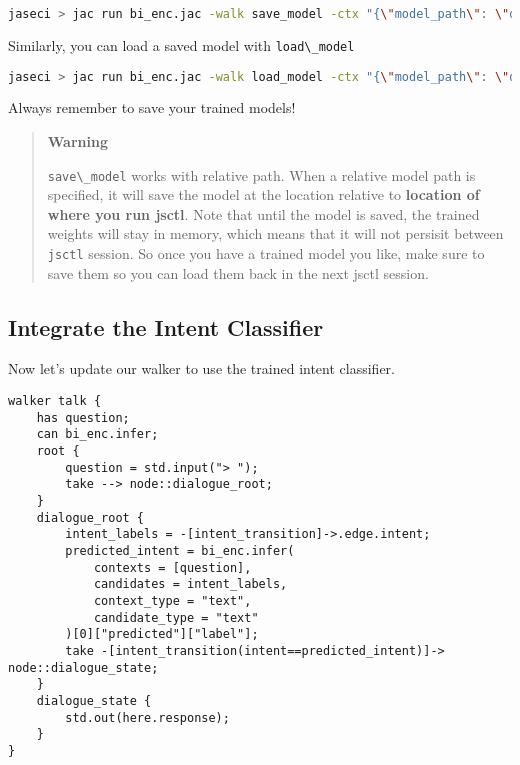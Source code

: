 \begin{lstlisting}[language=bash]
jaseci > jac run bi_enc.jac -walk save_model -ctx "{\"model_path\": \"dialogue_intent_model\"}"
\end{lstlisting}

Similarly, you can load a saved model with
\passthrough{\lstinline!load\_model!}

\begin{lstlisting}[language=bash]
jaseci > jac run bi_enc.jac -walk load_model -ctx "{\"model_path\": \"dialogue_intent_model\"}"
\end{lstlisting}

Always remember to save your trained models!

\begin{quote}
\textbf{Warning}

\passthrough{\lstinline!save\_model!} works with relative path. When a
relative model path is specified, it will save the model at the location
relative to \textbf{location of where you run jsctl}. Note that until
the model is saved, the trained weights will stay in memory, which means
that it will not persisit between \passthrough{\lstinline!jsctl!}
session. So once you have a trained model you like, make sure to save
them so you can load them back in the next jsctl session.
\end{quote}

\hypertarget{integrate-the-intent-classifier}{%
\subsection{Integrate the Intent
Classifier}\label{integrate-the-intent-classifier}}

Now let's update our walker to use the trained intent classifier.

\begin{lstlisting}
walker talk {
    has question;
    can bi_enc.infer;
    root {
        question = std.input("> ");
        take --> node::dialogue_root;
    }
    dialogue_root {
        intent_labels = -[intent_transition]->.edge.intent;
        predicted_intent = bi_enc.infer(
            contexts = [question],
            candidates = intent_labels,
            context_type = "text",
            candidate_type = "text"
        )[0]["predicted"]["label"];
        take -[intent_transition(intent==predicted_intent)]-> node::dialogue_state;
    }
    dialogue_state {
        std.out(here.response);
    }
}
\end{lstlisting}

